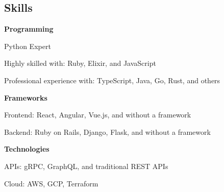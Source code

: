 \documentclass[margin,line]{resume}
\begin{document}
\begin{resume}
    \section{\mysidestyle \textbf{\large{S}\small{kills}}}
    \hspace{2.4mm}\textbf{Programming}\vspace{1mm}
    \begin{list2}
        \item Python Expert
        \item Highly skilled with: Ruby, Elixir, and JavaScript
        \item Professional experience with: TypeScript, Java, Go, Rust, and others
    \end{list2}\vspace{-1.5mm}

    \hspace{2.4mm}\textbf{Frameworks}\vspace{1mm}
    \begin{list2}
        \item Frontend: React, Angular, Vue.js, and without a framework
        \item Backend: Ruby on Rails, Django, Flask, and without a framework
    \end{list2}\vspace{-1.5mm}

    \hspace{2.4mm}\textbf{Technologies}\vspace{1mm}
    \begin{list2}
        \item APIs: gRPC, GraphQL, and traditional REST APIs
        \item Cloud: AWS, GCP, Terraform
    \end{list2}\vspace{-1.5mm}


\end{resume}
\end{document}
